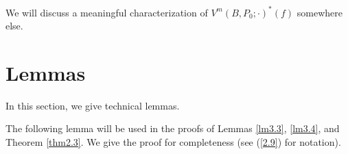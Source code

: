 \documentclass[12pt]{article}
\begin{document}
We will discuss a meaningful characterization of  $V^m(B,P_0;\cdot)^*(f)$ somewhere else.





















\section{Lemmas}\label{sec:3}


In this section, we give technical lemmas.

The following lemma will be used in the proofs of Lemmas \ref{lm3.3}, \ref{lm3.4}, and Theorem \ref{thm2.3}.
We give the proof for completeness  (see (\ref{2.9})  for notation).
\end{document}
